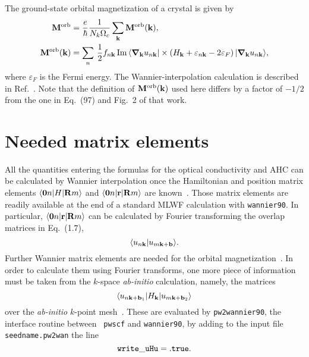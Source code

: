 The ground-state orbital magnetization of a crystal is given
by~\cite{xiao-rmp10,ceresoli-prb06}
%
\begin{align}
\label{eq:morb}
{\bf M}^{\rm orb}&=\frac{e}{\hbar}
\frac{1}{N_k\Omega_c}\sum_{\bf k}{\bf M}^{\rm orb}({\bf k}),\\
\label{eq:morb-k}
{\bf M}^{\rm orb}({\bf k})&=
\sum_n\,\frac{1}{2}f_{n{\bf k}}\,
{\rm Im}\,\langle \bm{\nabla}_{\bf k}u_{n{\bf k}}\vert
\times
\left(H_{\bf k}+\varepsilon_{n{\bf k}}-2\varepsilon_F\right)
\vert \bm{\nabla}_{\bf k}u_{n{\bf k}}\rangle,
\end{align}
%
where $\varepsilon_F$ is the Fermi energy. The Wannier-interpolation
calculation is described in Ref.~\cite{lopez-prb12}. Note that the
definition of ${\bf M}^{\rm orb}({\bf k})$ used here differs by a
factor of $-1/2$ from the one in Eq.~(97) and Fig.~2 of that work.



\section{Needed matrix elements}


All the quantities entering the formulas for the optical conductivity
and AHC can be calculated by Wannier interpolation once the
Hamiltonian and position matrix elements $\langle {\bf 0}n\vert H\vert
{\bf R}m\rangle$ and $\langle {\bf 0}n\vert {\bf r}\vert {\bf
  R}m\rangle$ are known~\cite{wang-prb06,yates-prb07}.  Those matrix
elements are readily available at the end of a standard MLWF
calculation with {\tt wannier90}. In particular, $\langle {\bf
  0}n\vert {\bf r}\vert {\bf R}m\rangle$ can be calculated by Fourier
transforming the overlap matrices in Eq.~(1.7),
%
$$\langle u_{n{\bf k}}\vert u_{m{\bf k}+{\bf b}}\rangle.
$$
%
Further Wannier matrix elements are needed for the orbital
magnetization~\cite{lopez-prb12}. In order to calculate them using
Fourier transforms, one more piece of information must be taken from
the $k$-space {\it ab-initio} calculation, namely, the matrices
%
$$\langle u_{n{\bf k}+{\bf b}_1}\vert
H_{\bf k}\vert u_{m{\bf k}+{\bf b}_2}\rangle
$$
%
over the {\it ab-initio} $k$-point mesh~\cite{lopez-prb12}.  These are
evaluated by {\tt pw2wannier90}, the interface routine between {\tt
  pwscf} and {\tt wannier90}, by adding to the input file {\tt
  seedname.pw2wan} the line
%
$${\tt
write\_uHu = .true.
}
$$


